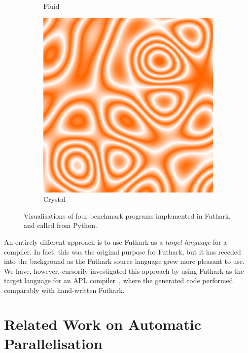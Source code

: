 \begin{figure}
\begin{subfigure}{0.24\textwidth}
    \caption{Fluid}
    \label{fig:fluid}
  \end{subfigure}
  \begin{subfigure}{0.24\textwidth}
    \includegraphics[width=\textwidth]{img/crystal.png}
    \caption{Crystal}
    \label{fig:crystal}
  \end{subfigure}

  \caption{Visualisations of four benchmark programs implemented in
    Futhark, and called from Python.}
  \label{fig:visualisations}
\end{figure}

An entirely different approach is to use Futhark as a \textit{target
  language} for a compiler.  In fact, this was the original purpose
for Futhark, but it has receded into the background as the Futhark
source language grew more pleasant to use.  We have, however,
cursorily investigated this approach by using Futhark as the target
language for an APL
compiler~\cite{Henriksen:2016:AGT:2975991.2975997}, where the
generated code performed comparably with hand-written Futhark.

\section{Related Work on Automatic Parallelisation}
\label{sec:related-automatic-par}

